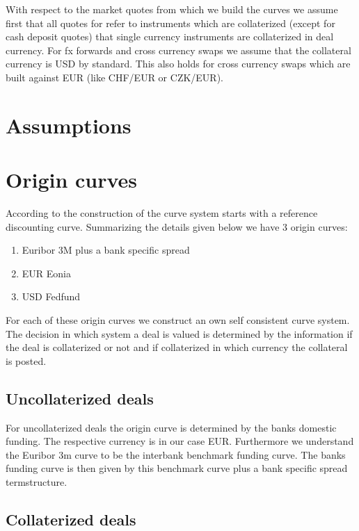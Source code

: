 \documentclass{amsart}
\theoremstyle{plain}
\numberwithin{equation}{section}
\begin{document}
With respect to the market quotes from which we build the curves we assume first that all quotes for refer to instruments which are collaterized (except for cash deposit quotes) that single currency instruments are collaterized in deal currency. For fx forwards and cross currency swaps we assume that the collateral currency is USD by standard. This also holds for cross currency swaps which are built against EUR (like CHF/EUR or CZK/EUR). 

\section{Assumptions}



\section{Origin curves}

According to \cite{Fuji} the construction of the curve system starts with a reference discounting curve. Summarizing the details given below we have 3 origin curves:

\begin{enumerate}
\item Euribor 3M plus a bank specific spread
\item EUR Eonia
\item USD Fedfund
\end{enumerate}

For each of these origin curves we construct an own self consistent curve system. The decision in which system a deal is valued is determined by the information if the deal is collaterized or not and if collaterized in which currency the collateral is posted.

\subsection{Uncollaterized deals}

For uncollaterized deals the origin curve is determined by the banks domestic funding. The respective currency is in our case EUR. Furthermore we understand 
the Euribor 3m curve to be the interbank benchmark funding curve. The banks funding curve is then given by this benchmark curve plus a bank specific spread termstructure.

\subsection{Collaterized deals}
\end{document}
